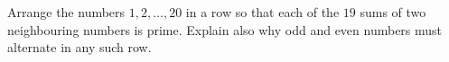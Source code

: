 Arrange the numbers $1,2,\ldots,20$ in a row so that each of the $19$ sums of two neighbouring numbers is prime. Explain also why odd and even numbers must alternate in any such row.
